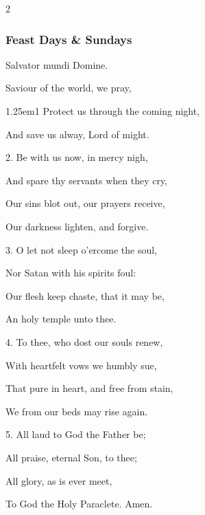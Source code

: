 \begin{multicols}{2}
\vspace{-0.65\baselineskip}

\subsubsection{Feast Days \& Sundays}

\vspace{-0.35\baselineskip}

\begin{inhead}
	Salvator mundi Domine.
\end{inhead}

 Saviour of the world, we pray,\par
{}
\begin{hangparas}{1.25em}{1}
Protect us through the coming night,\par
And save us alway, Lord of might.\\
\par
2. Be with us now, in mercy nigh,\par
And spare thy servants when they cry,\par
Our sins blot out, our prayers receive,\par
Our darkness lighten, and forgive.\\
\par
3. O let not sleep o'ercome the soul,\par
Nor Satan with his spirits foul:\par
Our flesh keep chaste, that it may be,\par
An holy temple unto thee.\\
\par
4. To thee, who dost our souls renew,\par
With heartfelt vows we humbly sue,\par
That pure in heart, and free from stain,\par
We from our beds may rise again.\\
\par
5. All laud to God the Father be;\par
All praise, eternal Son, to thee;\par
All glory, as is ever meet,\par
To God the Holy Paraclete. Amen.
\end{hangparas}

\vspace{-0.65\baselineskip}


\end{multicols}
